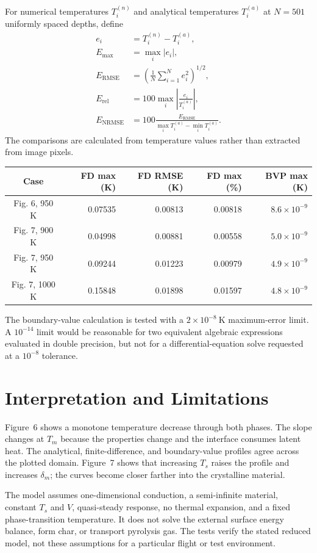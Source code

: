 \documentclass[11pt]{article}
\begin{document}
For numerical temperatures $T_i^{(n)}$ and analytical temperatures
$T_i^{(a)}$ at $N=501$ uniformly spaced depths, define
\begin{align}
 e_i&=T_i^{(n)}-T_i^{(a)},\\
 E_{\max}&=\max_i|e_i|,\\
 E_{\mathrm{RMSE}}&=
 \left(\frac{1}{N}\sum_{i=1}^{N}e_i^2\right)^{1/2},\\
 E_{\mathrm{rel}}&=100\max_i
 \left|\frac{e_i}{T_i^{(a)}}\right|,\\
 E_{\mathrm{NRMSE}}&=
 100\frac{E_{\mathrm{RMSE}}}
 {\max_iT_i^{(a)}-\min_iT_i^{(a)}}.
 \label{eq:error-measures}
\end{align}
The comparisons are calculated from temperature values rather than extracted
from image pixels.

\begin{center}
\begin{tabular}{c|r|r|r|r}
Case & FD max (K) & FD RMSE (K) & FD max (\%) & BVP max (K) \\
\hline
Fig. 6, 950 K  & 0.07535 & 0.00813 & 0.00818 & $8.6\times10^{-9}$ \\
Fig. 7, 900 K  & 0.04998 & 0.00881 & 0.00558 & $5.0\times10^{-9}$ \\
Fig. 7, 950 K  & 0.09244 & 0.01223 & 0.00979 & $4.9\times10^{-9}$ \\
Fig. 7, 1000 K & 0.15848 & 0.01898 & 0.01597 & $4.8\times10^{-9}$
\end{tabular}
\end{center}
The boundary-value calculation is tested with a
$2\times10^{-8}\ \mathrm{K}$ maximum-error limit. A $10^{-14}$ limit would be
reasonable for two equivalent algebraic expressions evaluated in double
precision, but not for a differential-equation solve requested at a
$10^{-8}$ tolerance.

\section{Interpretation and Limitations}
Figure~6 shows a monotone temperature decrease through both phases. The slope
changes at $T_m$ because the properties change and the interface consumes
latent heat. The analytical, finite-difference, and boundary-value profiles
agree across the plotted domain. Figure~7 shows that increasing $T_s$ raises
the profile and increases $\delta_m$; the curves become closer farther into
the crystalline material.

The model assumes one-dimensional conduction, a semi-infinite material,
constant $T_s$ and $V$, quasi-steady response, no thermal expansion, and a
fixed phase-transition temperature. It does not solve the external surface
energy balance, form char, or transport pyrolysis gas. The tests verify the
stated reduced model, not these assumptions for a particular flight or test
environment.
\end{document}

